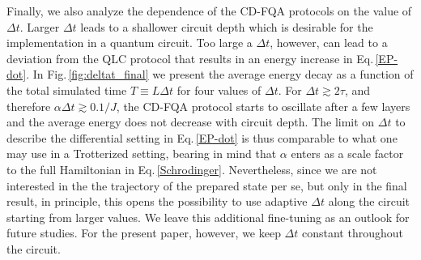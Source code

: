 \documentclass[twocolumn,aps,superscriptaddress,floatfix,longbibliography]{revtex4-2}
\newcommand{\Eq}[1]{Eq.\,\eqref{#1}}
\newcommand{\Fig}[1]{Fig.\,\ref{fig:#1}}
\begin{document}
Finally, %
we also 
analyze the dependence %
of the CD-FQA protocols on %
the value of $\Delta t$.
Larger %
$\Delta t$ leads to a shallower %
circuit depth which is   
desirable %
for the implementation in a quantum circuit.
Too large a %
$\Delta t$, however, can lead to a deviation from the QLC protocol that results in an energy increase
in \Eq{EP-dot}. In \Fig{deltat_final} we present the average energy decay as a function of 
the total simulated time
$T\equiv  L\Delta t$ for four values of $\Delta t$. For
$\Delta t \gtrsim 2\tau$,
and therefore $\alpha \Delta t \gtrsim 0.1/J$,
the CD-FQA protocol starts to oscillate after a few layers and the average energy does not decrease with circuit depth. 
The limit on $\Delta t$ to describe the differential
setting in \Eq{EP-dot} is thus comparable
to what one may use in a Trotterized setting,
bearing in mind that $\alpha$ enters as a scale
factor to the full Hamiltonian in \Eq{Schrodinger}.
Nevertheless, since we are not interested in the
the trajectory of the prepared state per se, but only
in the final result, in principle, this opens the
possibility to use adaptive $\Delta t$ along
the circuit starting from larger values.
We leave this additional fine-tuning as an
outlook for future studies.
For the present paper, however,
we keep $\Delta t$ constant throughout the circuit.
\end{document}

